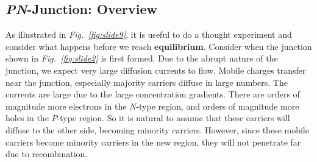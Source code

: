 \subsection{\emph{PN}-Junction: Overview}
As illustrated in \emph{Fig.~\ref{fig:slide9}}, it is useful to do a thought experiment and consider what happens before we reach \textbf{equilibrium}. Consider when the junction shown in \emph{Fig.~\ref{fig:slide2}} is first formed.  Due to the abrupt nature of the junction, we expect very large diffusion currents to flow.  Mobile charges transfer near the junction, especially majority carriers diffuse in large numbers.  The currents are large due to the large concentration gradients.  There are orders of magnitude more electrons in the $N$-type region, and orders of magnitude more holes in the $P$-type region.  So it is natural to assume that these carriers will diffuse to the other side, becoming minority carriers.  However, since these mobile carriers become minority carriers in the new region, they will not penetrate far due to recombination.


